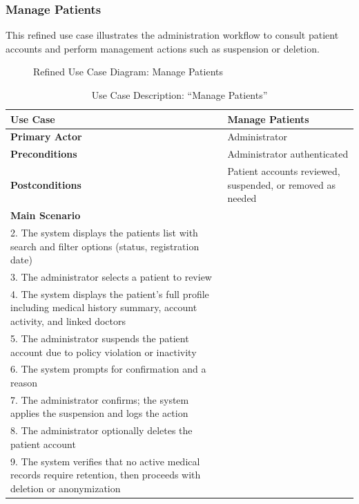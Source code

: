 \documentclass[12pt,a4paper,oneside]{report}
\begin{document}
\subsubsection{Manage Patients}

This refined use case illustrates the administration workflow to consult patient accounts and perform management actions such as suspension or deletion.

\begin{figure}[H]
    \centering
    \resizebox{0.85\textwidth}{!}{}
    \caption{Refined Use Case Diagram: Manage Patients}
    \label{fig:uc admin manage patients}
\end{figure}

\begin{table}[H]
\centering
\caption{Use Case Description: ``Manage Patients''}
\label{tab:uc admin manage patients}
\small
\begin{tabular}{|l|p{10cm}|}
\hline
\textbf{Use Case} & Manage Patients \\
\hline
\textbf{Primary Actor} & Administrator \\
\hline
\textbf{Preconditions} & Administrator authenticated \\
\hline
\textbf{Postconditions} & Patient accounts reviewed, suspended, or removed as needed \\
\hline
\textbf{Main Scenario} &
\begin{minipage}[t]{9.5cm}
\vspace{2pt}
1. The administrator opens the patients management page\\
2. The system displays the patients list with search and filter options (status, registration date)\\
3. The administrator selects a patient to review\\
4. The system displays the patient's full profile including medical history summary, account activity, and linked doctors\\
5. The administrator suspends the patient account due to policy violation or inactivity\\
6. The system prompts for confirmation and a reason\\
7. The administrator confirms; the system applies the suspension and logs the action\\
8. The administrator optionally deletes the patient account\\
9. The system verifies that no active medical records require retention, then proceeds with deletion or anonymization

\end{minipage}
\end{tabular}
\end{table}
\end{document}
